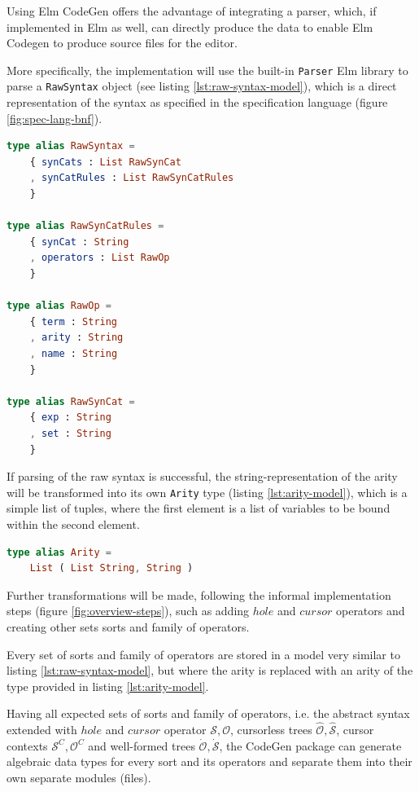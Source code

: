 \documentclass{article}
\begin{document}
Using Elm CodeGen offers the advantage of integrating a parser, which, if implemented in Elm as well, can directly produce the data to enable Elm Codegen to produce source files for the editor. 

More specifically, the implementation will use the built-in \texttt{Parser} Elm library to parse a \texttt{RawSyntax} object (see listing \ref{lst:raw-syntax-model}), which is a direct representation of the syntax as specified in the specification language (figure \ref{fig:spec-lang-bnf}). 

\begin{lstlisting}[language=elm,style=inline,caption={Raw syntax model in Elm},label={lst:raw-syntax-model}]
type alias RawSyntax =
    { synCats : List RawSynCat
    , synCatRules : List RawSynCatRules
    }

type alias RawSynCatRules =
    { synCat : String
    , operators : List RawOp
    }

type alias RawOp =
    { term : String
    , arity : String
    , name : String
    }

type alias RawSynCat =
    { exp : String
    , set : String
    }
\end{lstlisting}

If parsing of the raw syntax is successful, the string-representation of the arity will be transformed into its own \texttt{Arity} type (listing \ref{lst:arity-model}), which is a simple list of tuples, where the first element is a list of variables to be bound within the second element.

\begin{lstlisting}[language=elm,style=inline,caption={Arity model},label={lst:arity-model}]
type alias Arity =
    List ( List String, String )
\end{lstlisting}

Further transformations will be made, following the informal implementation steps (figure \ref{fig:overview-steps}), such as adding $hole$ and $cursor$ operators and creating other sets sorts and family of operators. 

Every set of sorts and family of operators are stored in a model very similar to listing \ref{lst:raw-syntax-model}, but where the arity is replaced with an arity of the type provided in listing \ref{lst:arity-model}.

Having all expected sets of sorts and family of operators, i.e. the abstract syntax extended with $hole$ and $cursor$ operator $\mathcal{S}, \mathcal{O}$, cursorless trees $\hat{\mathcal{O}},\hat{\mathcal{S}}$, cursor contexts $\mathcal{S}^C,\mathcal{O}^C$ and well-formed trees $\dot{\mathcal{O}},\dot{\mathcal{S}}$, the CodeGen package can generate algebraic data types for every sort and its operators and separate them into their own separate modules (files). 
\end{document}
